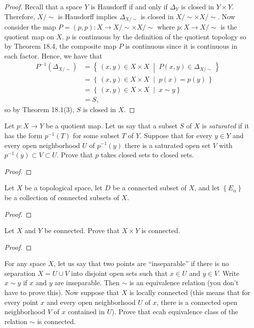 \begin{proof}
Recall that a space $Y$ is Hausdorff if and only if $\Delta_Y$ is
closed in $Y\times Y$. Therefore, $X/{\sim}$ is Hausdorff implies
$\Delta_{X/{\sim}}$ is closed in $X/{\sim}\times X/{\sim}$. Now
consider the map $P=(p,p)\colon X\to X/{\sim}\times
X/{\sim}$ where $p\colon X\to X/{\sim}$ is the quotient map on
$X$. $p$ is continuous by the definition of the quotient topology
so by Theorem 18.4, the composite map $P$ is continuous since it
is continuous in each factor. Hence, we have that
\begin{align*}
P^{-1}(\Delta_{X/{\sim}})
&=
\left\{\,(x,y)\in X\times X\;\middle|\;P(x,y)\in\Delta_{X/{\sim}}\,\right\}\\
&=
\left\{\,(x,y)\in X\times X\;\middle|\;p(x)=p(y)\,\right\}\\
&=
\left\{\,(x,y)\in X\times X\;\middle|\;x\sim y\right\}\\
&=S,
\end{align*}
so by Theorem 18.1(3), $S$ is closed in $X$.
\end{proof}
\begin{problem}
Let $p\colon X\to Y$ be a quotient map. Let us say that a subset
$S$ of $X$ is \emph{saturated} if it has the form $p^{-1}(T)$ for
some subset $T$ of $Y$. Suppose that for every $y\in Y$ and every
open neighborhood $U$ of $p^{-1}(y)$ there is a saturated open
set $V$ with $p^{-1}(y)\subset V\subset U$. Prove that $p$ takes
closed sets to closed sets.
\end{problem}
\begin{proof}

\end{proof}
\begin{problem}
Let $X$ be a topological space, let $D$ be a connected subset of
$X$, and let $\left\{E_\alpha\right\}$ be a collection of
connected subsets of $X$.
\end{problem}
\begin{proof}
\end{proof}
\begin{problem}
Let $X$ and $Y$ be connected. Prove that $X\times Y$ is connected.
\end{problem}
\begin{proof}
\end{proof}
\begin{problem}
For any space $X$, let us say that two points are ``inseparable''
if there is no separation $X=U\cup V$ into disjoint open sets
such that $x\in U$ and $y\in V$. Write $x\sim y$ if $x$ and $y$
are inseparable. Then $\sim$ is an equivalence relation (you
don't have to prove this). Now suppose that $X$ is locally
connected (this means that for every point $x$ and every open
neighborhood $U$ of $x$, there is a connected open neighborhood
$V$ of $x$ contained in $U$). Prove that ecah equivalence class
of the relation $\sim$ is connected.
\end{problem}
